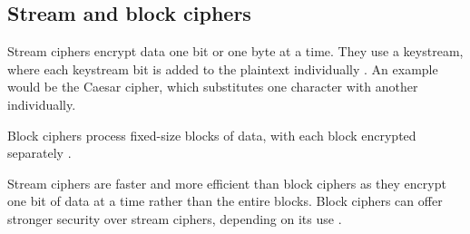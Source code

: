 \subsection{Stream and block ciphers}

Stream ciphers encrypt data one bit or one byte at a time.
They use a keystream, where each keystream bit is added to the plaintext individually \cite{Paar2024}.
An example would be the Caesar cipher, which substitutes one character with another individually.

Block ciphers process fixed-size blocks of data, with each block encrypted separately \cite{Paar2024}.

Stream ciphers are faster and more efficient than block ciphers as they encrypt one bit of data at a time rather than the entire blocks. 
Block ciphers can offer stronger security over stream ciphers, depending on its use \cite{Paar2024}. 